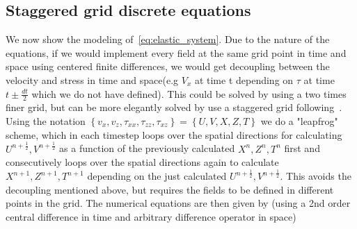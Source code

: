 \documentclass[fleqn,11pt]{SelfArx} %
\theoremstyle{definition}
\begin{document}
\subsection{Staggered grid discrete equations}
We now show the modeling of~\cref{eq:elastic_system}.
Due to the nature of the equations, if we would implement every field at the same grid point in time and space using centered finite differences, we would get decoupling between the velocity and stress in time and space(e.g $V_x$ at time t depending on $\tau$ at time $t \pm \frac{dt}{2}$ which we do not have defined).
This could be solved by using a two times finer grid, but can be more elegantly solved by use a staggered grid following~\cite{Virieux1984}.
Using the notation $\left\{v_x, v_z, \tau_{xx}, \tau_{zz}, \tau_{xz}\right\} = \left\{U, V, X, Z, T \right\}$ we do a "leapfrog" scheme, which in each timestep loops over the spatial directions for calculating $U^{n+\frac{1}{2}},V^{n+\frac{1}{2}}$ as a function of the previously calculated $X^n, Z^n, T^n$ first and consecutively loops over the spatial directions again to calculate $X^{n+1}, Z^{n+1}, T^{n+1}$ depending on the just calculated $U^{n+\frac{1}{2}},V^{n+\frac{1}{2}}$. 
This avoids the decoupling mentioned above, but requires the fields to be defined in different points in the grid.
The numerical equations are then given by (using a 2nd order central difference in time and arbitrary difference operator in space)
\end{document}
